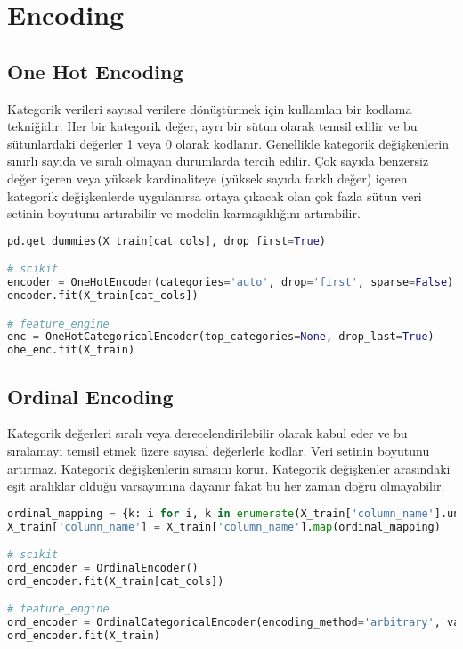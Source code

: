 \section{Encoding}

\subsection{One Hot Encoding}
Kategorik verileri sayısal verilere dönüştürmek için kullanılan bir kodlama tekniğidir. Her bir kategorik değer, ayrı bir sütun olarak temsil edilir ve bu sütunlardaki değerler 1 veya 0 olarak kodlanır. Genellikle kategorik değişkenlerin sınırlı sayıda ve sıralı olmayan durumlarda tercih edilir. Çok sayıda benzersiz değer içeren veya yüksek kardinaliteye (yüksek sayıda farklı değer) içeren kategorik değişkenlerde uygulanırsa ortaya çıkacak olan çok fazla sütun veri setinin boyutunu artırabilir ve modelin karmaşıklığını artırabilir.

\begin{lstlisting}[language=Python, caption=Scikit-learn'de OneHotEncoding örneği.]
pd.get_dummies(X_train[cat_cols], drop_first=True)

# scikit
encoder = OneHotEncoder(categories='auto', drop='first', sparse=False)
encoder.fit(X_train[cat_cols])

# feature_engine
enc = OneHotCategoricalEncoder(top_categories=None, drop_last=True)
ohe_enc.fit(X_train)
\end{lstlisting}

\subsection{Ordinal Encoding}
Kategorik değerleri sıralı veya derecelendirilebilir olarak kabul eder ve bu sıralamayı temsil etmek üzere sayısal değerlerle kodlar. Veri setinin boyutunu artırmaz. Kategorik değişkenlerin sırasını korur. Kategorik değişkenler arasındaki eşit aralıklar olduğu varsayımına dayanır fakat bu her zaman doğru olmayabilir.

\begin{lstlisting}[language=Python, caption=Scikit-learn'de OrdinalEncoding örneği.]
ordinal_mapping = {k: i for i, k in enumerate(X_train['column_name'].unique(), 0)}
X_train['column_name'] = X_train['column_name'].map(ordinal_mapping)

# scikit
ord_encoder = OrdinalEncoder()
ord_encoder.fit(X_train[cat_cols])

# feature_engine
ord_encoder = OrdinalCategoricalEncoder(encoding_method='arbitrary', variables=cat_cols)
ord_encoder.fit(X_train)
\end{lstlisting}

